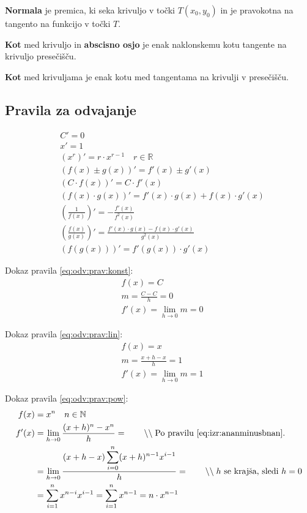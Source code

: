 \documentclass[a4paper,oneside,12pt,fleqn]{article}
\def\R{\ensuremath{\mathbb R}}
\def\N{\ensuremath{\mathbb N}}
\newcommand\krat\cdot
\newcommand{\comment}[1]{\ensuremath{\qquad\backslash\backslash\;}\textnormal{#1}}
\def\limh{\lim_{h\rightarrow0}} %
\numberwithin{equation}{section}
\begin{document}
\textbf{Normala} je premica, ki seka krivuljo v točki $T(x_0, y_0)$ in je pravokotna na tangento na
funkcijo v točki $T$.

\textbf{Kot} med krivuljo in \textbf{abscisno osjo} je enak naklonskemu kotu tangente na krivuljo
presečišču.

\textbf{Kot} med krivuljama je enak kotu med tangentama na krivulji v presečišču.

\subsection{Pravila za odvajanje}
\label{sec:odvod:prav}

\begin{align}
  & C' = 0 \label{eq:odv:prav:konst} \\
  & x' = 1 \label{eq:odv:prav:lin} \\
  & \left( x^r \right)' = r\krat x^{r-1} \quad r \in \R \label{eq:odv:prav:pow} \\
  & (f(x) \pm g(x))' = f'(x) \pm g'(x) \label{eq:odv:prav:sum} \\
  & (C\krat f(x))' = C\krat f'(x) \label{eq:odv:prav:konstkrat} \\
  & (f(x)\krat g(x))' = f'(x)\krat g(x) + f(x)\krat g'(x) \label{eq:odv:prav:krat} \\
  & \left(\frac{1}{f(x)}\right)' = - \frac{f'(x)}{f^2(x)} \label{eq:odv:prav:enaz} \\
  & \left( \frac{f(x)}{g(x)} \right)' = \frac{f'(x)\krat g(x) - f(x)\krat g'(x)}{g^2(x)} \label{eq:odv:prav:del} \\
  & \left( f(g(x)) \right)' = f'(g(x))\krat g'(x) \label{eq:odv:prav:komp}
\end{align}

Dokaz pravila \eqref{eq:odv:prav:konst}:
\begin{align*}
  & f(x) = C \\
  & m = \frac{C - C}{h} = 0 \\
  & f'(x) = \limh  m = 0
\end{align*}

Dokaz pravila \eqref{eq:odv:prav:lin}:
\begin{align*}
  & f(x) = x \\
  & m = \frac{x+h-x}{h} = 1 \\
  & f'(x) = \limh  m = 1
\end{align*}

Dokaz pravila \eqref{eq:odv:prav:pow}:
\begin{align*}
  f(x) &= x^n  \quad n \in \N \\
  f'(x) &= \limh  \frac{(x+h)^n - x^n}{h} = \comment{Po pravilu \eqref{eq:izr:ananminusbnan}.} \\
  &= \limh  \frac{(x+h-x)\displaystyle\sum_{i=0}^n (x+h)^{n-1}x^{i-1}}{h} = \comment{$h$ se krajša, sledi $h = 0$} \\
  &= \sum_{i=1}^nx^{n-i}x^{i-1} = \sum_{i=1}^nx^{n-1} = n\krat x^{n-1}
\end{align*}
\end{document}
